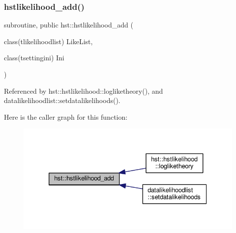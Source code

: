 \subsubsection{\texorpdfstring{hstlikelihood\+\_\+add()}{hstlikelihood\_add()}}
{\footnotesize\ttfamily subroutine, public hst\+::hstlikelihood\+\_\+add (\begin{DoxyParamCaption}\item[{class(tlikelihoodlist)}]{Like\+List,  }\item[{class(tsettingini)}]{Ini }\end{DoxyParamCaption})}



Referenced by hst\+::hstlikelihood\+::logliketheory(), and datalikelihoodlist\+::setdatalikelihoods().

Here is the caller graph for this function\+:
\nopagebreak
\begin{figure}[H]
\begin{center}
\leavevmode
\includegraphics[width=330pt]{namespacehst_aeb6aaa5b905562155375f8add86df3ec_icgraph}
\end{center}
\end{figure}
